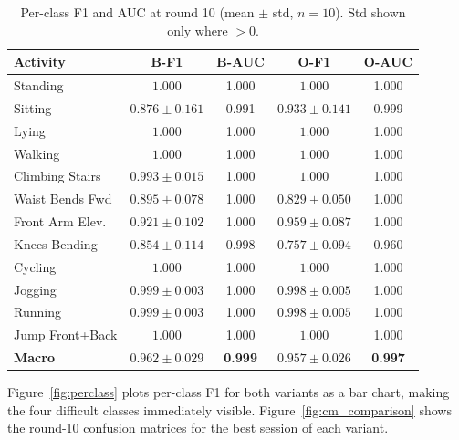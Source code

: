 \documentclass{llncs}
\begin{document}
\begin{table}[t]
\caption{Per-class F1 and AUC at round 10 (mean $\pm$ std, $n=10$).
  Std shown only where $>0$.}
\label{tab:perclass}
\centering\footnotesize
\setlength{\tabcolsep}{3.5pt}
\begin{tabular}{lcccc}
\toprule
\textbf{Activity} &
  \textbf{B-F1} & \textbf{B-AUC} &
  \textbf{O-F1} & \textbf{O-AUC} \\
\midrule
Standing        & $1.000$            & 1.000 & $1.000$            & 1.000 \\
Sitting         & $0.876{\pm}0.161$  & 0.991 & $0.933{\pm}0.141$  & 0.999 \\
Lying           & $1.000$            & 1.000 & $1.000$            & 1.000 \\
Walking         & $1.000$            & 1.000 & $1.000$            & 1.000 \\
Climbing Stairs & $0.993{\pm}0.015$  & 1.000 & $1.000$            & 1.000 \\
Waist Bends Fwd & $0.895{\pm}0.078$  & 1.000 & $0.829{\pm}0.050$  & 1.000 \\
Front Arm Elev. & $0.921{\pm}0.102$  & 1.000 & $0.959{\pm}0.087$  & 1.000 \\
Knees Bending   & $0.854{\pm}0.114$  & 0.998 & $0.757{\pm}0.094$  & 0.960 \\
Cycling         & $1.000$            & 1.000 & $1.000$            & 1.000 \\
Jogging         & $0.999{\pm}0.003$  & 1.000 & $0.998{\pm}0.005$  & 1.000 \\
Running         & $0.999{\pm}0.003$  & 1.000 & $0.998{\pm}0.005$  & 1.000 \\
Jump Front+Back & $1.000$            & 1.000 & $1.000$            & 1.000 \\
\midrule
\textbf{Macro}  & $\mathbf{0.962{\pm}0.029}$ & \textbf{0.999} &
                  $\mathbf{0.957{\pm}0.026}$ & \textbf{0.997} \\
\bottomrule
\end{tabular}
\end{table}

Figure~\ref{fig:perclass} plots per-class F1 for both variants as a bar
chart, making the four difficult classes immediately visible.
Figure~\ref{fig:cm_comparison} shows the round-10 confusion matrices for
the best session of each variant.
\end{document}
